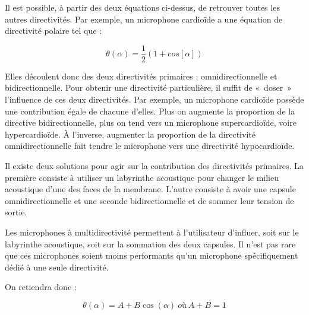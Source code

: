 \documentclass[
  letterpaper,
  DIV=11,
  numbers=noendperiod]{scrreprt}
\begin{document}
Il est possible, à partir des deux équations ci-dessus, de retrouver
toutes les autres directivités. Par exemple, un microphone cardioïde a
une équation de directivité polaire tel que :

\[ \theta(\alpha) = \frac{1}{2}(1 + cos[\alpha]) \]

Elles découlent donc des deux directivités primaires :
omnidirectionnelle et bidirectionnelle. Pour obtenir une directivité
particulière, il suffit de «~doser~» l'influence de ces deux
directivités. Par exemple, un microphone cardioïde possède une
contribution égale de chacune d'elles. Plus on augmente la proportion de
la directive bidirectionnelle, plus on tend vers un microphone
supercardioïde, voire hypercardioïde. À l'inverse, augmenter la
proportion de la directivité omnidirectionnelle fait tendre le
microphone vers une directivité hypocardioïde.

Il existe deux solutions pour agir sur la contribution des directivités
primaires. La première consiste à utiliser un labyrinthe acoustique pour
changer le milieu acoustique d'une des faces de la membrane. L'autre
consiste à avoir une capsule omnidirectionnelle et une seconde
bidirectionnelle et de sommer leur tension de sortie.

Les microphones à multidirectivité permettent à l'utilisateur d'influer,
soit sur le labyrinthe acoustique, soit sur la sommation des deux
capsules. Il n'est pas rare que ces microphones soient moins performants
qu'un microphone spécifiquement dédié à une seule directivité.

On retiendra donc :

\[ \theta(\alpha) = A + B \cos (\alpha) \> où \> A + B = 1\]
\end{document}
